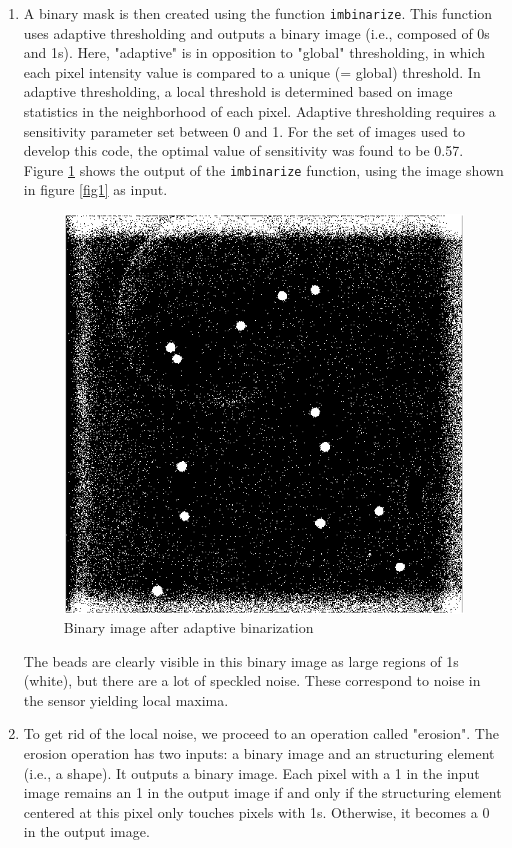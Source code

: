 \documentclass[a4paper]{article}
\begin{document}
\begin{enumerate}
    \item A binary mask is then created using the function \verb|imbinarize|. This function uses adaptive thresholding and outputs a binary image (i.e., composed of 0s and 1s). Here, "adaptive" is in opposition to "global" thresholding, in which each pixel intensity value is compared to a unique (= global) threshold. In adaptive thresholding, a local threshold is determined based on image statistics in the neighborhood of each pixel. Adaptive thresholding requires a sensitivity parameter set between 0 and 1. For the set of images used to develop this code, the optimal value of sensitivity was found to be 0.57. Figure \ref{fig2} shows the output of the \verb|imbinarize| function, using the image shown in figure \ref{fig1} as input.
    
    \begin{figure}[H]
        \center
        \label{fig2}
        \includegraphics[scale=0.75]{firstbin.png}
        \caption{Binary image after adaptive binarization}
    \end{figure}

    The beads are clearly visible in this binary image as large regions of 1s (white), but there are a lot of speckled noise. These correspond to noise in the sensor yielding local maxima. 
    
    \item To get rid of the local noise, we proceed to an operation called "erosion". The erosion operation has two inputs: a binary image and an structuring element (i.e., a shape). It outputs a binary image. Each pixel with a 1 in the input image remains an 1 in the output image if and only if the structuring element centered at this pixel only touches pixels with 1s. Otherwise, it becomes a 0 in the output image. 
    

\end{enumerate}
\end{document}
